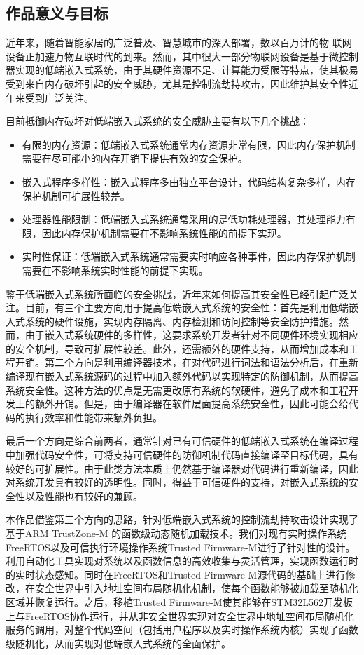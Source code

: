 \documentclass[UTF8,12pt,a4paper]{ctexart}
\numberwithin{figure}{section}
\begin{document}
\subsection{作品意义与目标}
\par 近年来，随着智能家居的广泛普及、智慧城市的深入部署，数以百万计的物 联网设备正加速万物互联时代的到来。然而，其中很大一部分物联网设备是基于微控制器实现的低端嵌入式系统，由于其硬件资源不足、计算能力受限等特点，使其极易受到来自内存破坏引起的安全威胁，尤其是控制流劫持攻击，因此维护其安全性近年来受到广泛关注。
\par 目前抵御内存破坏对低端嵌入式系统的安全威胁主要有以下几个挑战：
\begin{itemize}
    \item 有限的内存资源：低端嵌入式系统通常内存资源非常有限，因此内存保护机制需要在尽可能小的内存开销下提供有效的安全保护。
    \item 嵌入式程序多样性：嵌入式程序多由独立平台设计，代码结构复杂多样，内存保护机制可扩展性较差。
    \item 处理器性能限制：低端嵌入式系统通常采用的是低功耗处理器，其处理能力有限，因此内存保护机制需要在不影响系统性能的前提下实现。
    \item 实时性保证：低端嵌入式系统通常需要实时响应各种事件，因此内存保护机制需要在不影响系统实时性能的前提下实现。
\end{itemize}
\par 鉴于低端嵌入式系统所面临的安全挑战，近年来如何提高其安全性已经引起广泛关注。目前，有三个主要方向用于提高低端嵌入式系统的安全性：首先是利用低端嵌入式系统的硬件设施，实现内存隔离、内存检测和访问控制等安全防护措施。然而，由于嵌入式系统硬件的多样性，这要求系统开发者针对不同硬件环境实现相应的安全机制，导致可扩展性较差。此外，还需额外的硬件支持，从而增加成本和工程开销。第二个方向是利用编译器技术，在对代码进行词法和语法分析后，在重新编译现有嵌入式系统源码的过程中加入额外代码以实现特定的防御机制，从而提高系统安全性。这种方法的优点是无需更改原有系统的软硬件，避免了成本和工程开发上的额外开销。但是，由于编译器在软件层面提高系统安全性，因此可能会给代码的执行效率和性能带来额外负担。
\par 最后一个方向是综合前两者，通常针对已有可信硬件的低端嵌入式系统在编译过程中加强代码安全性，可将支持可信硬件的防御机制代码直接编译至目标代码，具有较好的可扩展性。由于此类方法本质上仍然基于编译器对代码进行重新编译，因此对系统开发具有较好的透明性。同时，得益于可信硬件的支持，对嵌入式系统的安全性以及性能也有较好的兼顾。 
\par 本作品借鉴第三个方向的思路，针对低端嵌入式系统的控制流劫持攻击设计实现了基于ARM TrustZone-M 的函数级动态随机加载技术。我们对现有实时操作系统FreeRTOS以及可信执行环境操作系统Trusted Firmware-M进行了针对性的设计。利用自动化工具实现对系统以及函数信息的高效收集与灵活管理，实现函数运行时的实时状态感知。同时在FreeRTOS和Trusted Firmware-M源代码的基础上进行修改，在安全世界中引入地址空间布局随机化机制，使每个函数能够被加载至随机化区域并恢复运行。之后，移植Trusted Firmware-M使其能够在STM32L562开发板上与FreeRTOS协作运行，并从非安全世界实现对安全世界中地址空间布局随机化服务的调用，对整个代码空间（包括用户程序以及实时操作系统内核）实现了函数级随机化，从而实现对低端嵌入式系统的全面保护。
\end{document}
